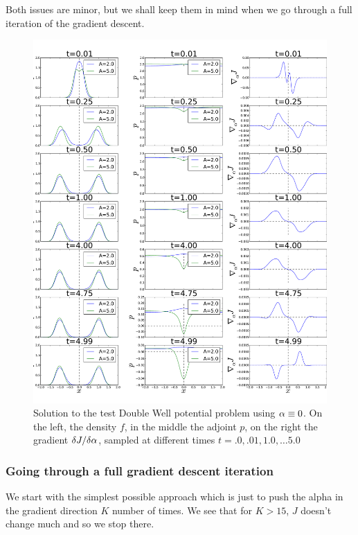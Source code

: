 \documentclass{article}
\begin{document}
Both issues are minor, but we shall keep them in mind when we go through a full
iteration of the gradient descent. 
\begin{figure}[htp] 
\begin{center} 
  \includegraphics[width=\textwidth]{Figs/DoublewellFBSolver/FB_alpha_null_solution.pdf}
  \caption[labelInTOC]{Solution to the test Double Well potential problem using
  ${\alpha} \equiv 0$. On the left, the density $f$, in the middle the adjoint $p$, 
  on the right the gradient $\delta J/ \delta {\alpha}$, sampled at different times
  $t=.0, .01, 1.0,\ldots5.0$}
  \label{fig:FBSoln_doublewell_alpha_null}
\end{center}
\end{figure}
 \clearpage

\subsubsection{Going through a full gradient descent iteration}
We start with the simplest possible approach which is just to push the alpha in
the gradient direction $K$ number of times. We see that for $K> 15$, $J$ doesn't
change much and so we stop there. 
\end{document}
